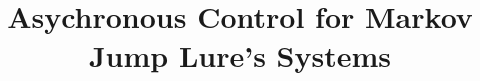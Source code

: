 \documentclass[conference]{IEEEtran}
\begin{document}
%
\title{Asychronous Control for Markov Jump Lure's Systems}




% 
\end{document}
